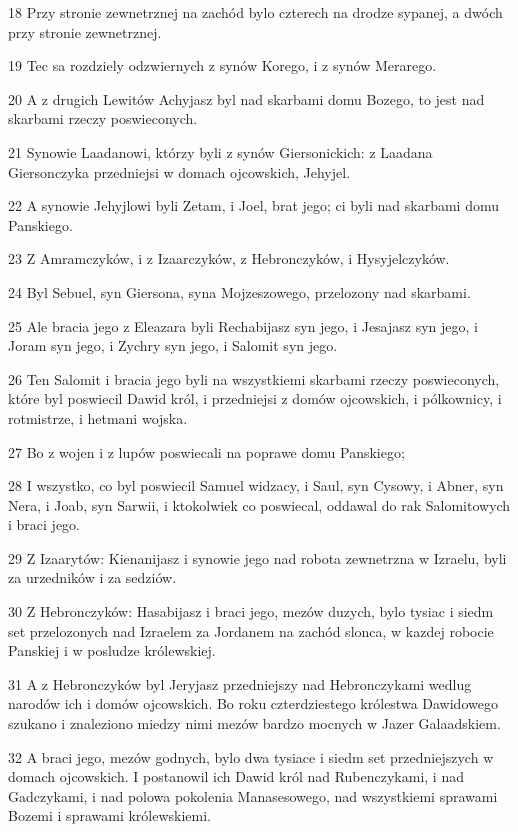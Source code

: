 \par 18 Przy stronie zewnetrznej na zachód bylo czterech na drodze sypanej, a dwóch przy stronie zewnetrznej.
\par 19 Tec sa rozdziely odzwiernych z synów Korego, i z synów Merarego.
\par 20 A z drugich Lewitów Achyjasz byl nad skarbami domu Bozego, to jest nad skarbami rzeczy poswieconych.
\par 21 Synowie Laadanowi, którzy byli z synów Giersonickich: z Laadana Giersonczyka przedniejsi w domach ojcowskich, Jehyjel.
\par 22 A synowie Jehyjlowi byli Zetam, i Joel, brat jego; ci byli nad skarbami domu Panskiego.
\par 23 Z Amramczyków, i z Izaarczyków, z Hebronczyków, i Hysyjelczyków.
\par 24 Byl Sebuel, syn Giersona, syna Mojzeszowego, przelozony nad skarbami.
\par 25 Ale bracia jego z Eleazara byli Rechabijasz syn jego, i Jesajasz syn jego, i Joram syn jego, i Zychry syn jego, i Salomit syn jego.
\par 26 Ten Salomit i bracia jego byli na wszystkiemi skarbami rzeczy poswieconych, które byl poswiecil Dawid król, i przedniejsi z domów ojcowskich, i pólkownicy, i rotmistrze, i hetmani wojska.
\par 27 Bo z wojen i z lupów poswiecali na poprawe domu Panskiego;
\par 28 I wszystko, co byl poswiecil Samuel widzacy, i Saul, syn Cysowy, i Abner, syn Nera, i Joab, syn Sarwii, i ktokolwiek co poswiecal, oddawal do rak Salomitowych i braci jego.
\par 29 Z Izaarytów: Kienanijasz i synowie jego nad robota zewnetrzna w Izraelu, byli za urzedników i za sedziów.
\par 30 Z Hebronczyków: Hasabijasz i braci jego, mezów duzych, bylo tysiac i siedm set przelozonych nad Izraelem za Jordanem na zachód slonca, w kazdej robocie Panskiej i w posludze królewskiej.
\par 31 A z Hebronczyków byl Jeryjasz przedniejszy nad Hebronczykami wedlug narodów ich i domów ojcowskich. Bo roku czterdziestego królestwa Dawidowego szukano i znaleziono miedzy nimi mezów bardzo mocnych w Jazer Galaadskiem.
\par 32 A braci jego, mezów godnych, bylo dwa tysiace i siedm set przedniejszych w domach ojcowskich. I postanowil ich Dawid król nad Rubenczykami, i nad Gadczykami, i nad polowa pokolenia Manasesowego, nad wszystkiemi sprawami Bozemi i sprawami królewskiemi.

